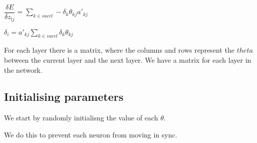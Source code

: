 \(\dfrac{\delta E}{\delta z_{lj}}=\sum_{k\in succ{l}}-\delta_{k}\theta_{kj}a'_{kj}\)

\(\delta_i=a'_{kj}\sum_{k\in succ{l}}\delta_{k}\theta_{kj}\)

For each layer there is a matrix, where the columns and rows represent the \(theta \) between the current layer and the next layer. We have a matrix for each layer in the network.

\subsection{Initialising parameters}

We start by randomly initialisng the value of each \(\theta \).

We do this to prevent each neuron from moving in sync.
